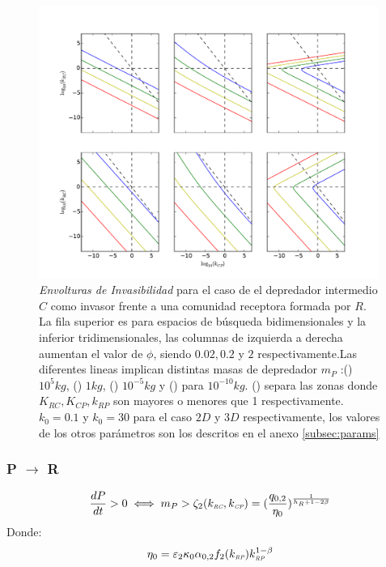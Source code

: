 \begin{figure}
  \centering
  \includegraphics[width = 0.99\textwidth]{./Plots/Z(IC2)AcGrGr.pdf}
  \caption[Env $Z(IC2)$]{\emph{Envolturas de Invasibilidad} para el caso de el depredador intermedio $C$ como invasor frente a una comunidad receptora formada por $R$. La fila superior es para espacios de b\'usqueda bidimensionales y la inferior tridimensionales, las columnas de izquierda a derecha aumentan el valor de $\phi$, siendo $0.02,0.2$ y $2$ respectivamente.Las diferentes lineas implican distintas masas de depredador $m_P$ :({\hwplotR}) $10^5 kg$,  ({\hwplotY}) $1kg$, ({\hwplotG}) $10^{-5}kg$ y ({\hwplotB}) para $10^{-10}kg$. ({\hwplotK}) separa las zonas donde $K_{RC},K_{CP},k_{RP}$ son mayores o menores que 1 respectivamente. $k_0 = 0.1$ y $k_0 = 30$ para el caso $2D$ y $3D$ respectivamente, los valores de los otros par\'ametros son los descritos en el anexo \ref{subsec:params}}
  \label{fig:Z(IC2)}
\end{figure}

\subsubsection{P $\to$ R}

\begin{equation}
  \frac{dP}{dt} >0 \iff  m_P > \zeta_2(k_{\textit{\tiny RC}},k_{\textit{\tiny CP}}) = (\frac{q_{0,2}}{\eta_0})^{\frac{1}{h_R +1 - 2\beta}}
\end{equation}
Donde:
\begin{equation}
  \begin{aligned}
    \eta_0 &= \varepsilon_2 \kappa_0\alpha_{0,2} f_2(k_{\textit{\tiny RP}})k_{\textit{\tiny RP}}^{1-\beta} \\
  \end{aligned}
\end{equation}


